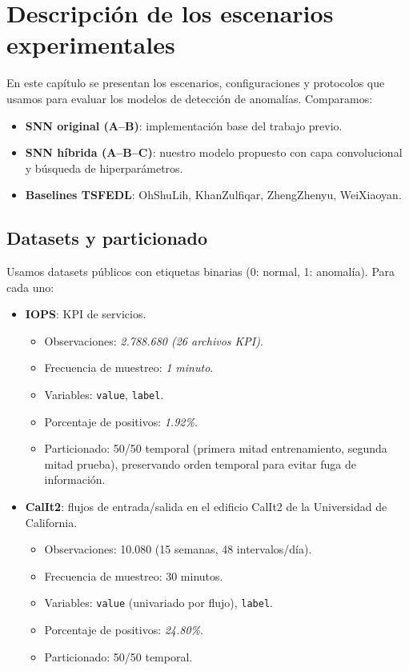 \section{Descripción de los escenarios experimentales}

En este capítulo se presentan los escenarios, configuraciones y protocolos que usamos para evaluar los modelos de detección de anomalías. Comparamos:
\begin{itemize}
    \item \textbf{SNN original (A--B)}: implementación base del trabajo previo.
    \item \textbf{SNN híbrida (A--B--C)}: nuestro modelo propuesto con capa convolucional y búsqueda de hiperparámetros.
    \item \textbf{Baselines TSFEDL}: OhShuLih, KhanZulfiqar, ZhengZhenyu, WeiXiaoyan.
\end{itemize}

\subsection{Datasets y particionado}
Usamos datasets públicos con etiquetas binarias (0: normal, 1: anomalía). Para cada uno:
\begin{itemize}
    \item \textbf{IOPS}: KPI de servicios. 
    \begin{itemize}
        \item Observaciones: \textit{2.788.680 (26 archivos KPI)}.
        \item Frecuencia de muestreo: \textit{1 minuto}.
        \item Variables: \texttt{value}, \texttt{label}.
        \item Porcentaje de positivos: \textit{1.92\%}.
        \item Particionado: 50/50 temporal (primera mitad entrenamiento, segunda mitad prueba), preservando orden temporal para evitar fuga de información.
    \end{itemize}
    \item \textbf{CalIt2}: flujos de entrada/salida en el edificio CalIt2 de la Universidad de California.
    \begin{itemize}
        \item Observaciones: 10.080 (15 semanas, 48 intervalos/día).
        \item Frecuencia de muestreo: 30 minutos.
        \item Variables: \texttt{value} (univariado por flujo), \texttt{label}.
        \item Porcentaje de positivos: \textit{24.80\%}.
        \item Particionado: 50/50 temporal. 
    \end{itemize}
\end{itemize}

